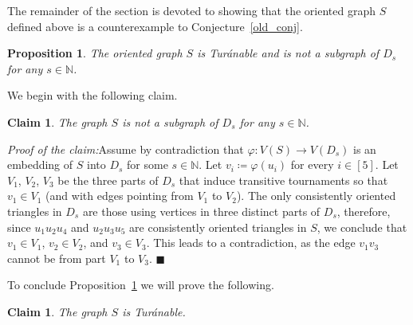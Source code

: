 \documentclass[11pt]{amsart}
\newtheorem{claim}[theorem]{Claim}
\newtheorem{prop}[theorem]{Proposition}
\def\N{\mathbb{N}}
\newenvironment{claimproof}[1]{\par\noindent\textit{Proof of the claim:}\space#1}{\leavevmode\unskip\penalty9999 \hbox{}\nobreak\hfill\quad\hbox{$\blacksquare$}}
\begin{document}
The remainder of the section is devoted to showing that the oriented graph $S$ defined above is a counterexample to Conjecture~\ref{old_conj}.

\begin{prop} \label{prop:S} 
    The oriented graph $S$ is Tur\'anable and is not a subgraph of $D_s$ for any $s \in \N$.
\end{prop}

We begin with the following claim.

\begin{claim} \label{claim:S_not_in_Ds}
    The graph $S$ is not a subgraph of $D_s$ for any $s \in \N$.
\end{claim}

\begin{claimproof}
    Assume by contradiction that $\varphi: V(S) \to V(D_s)$ is an embedding of $S$ into $D_s$ for some $s \in \N$. Let $v_i \coloneqq \varphi(u_i)$ for every $i \in [5]$. Let $V_1$, $V_2$, $V_3$ be the three parts of $D_s$ that induce transitive tournaments so that $v_1 \in V_1$ (and with edges pointing from $V_1$ to $V_2$). The only consistently oriented triangles in $D_s$ are those using vertices in three distinct parts of $D_s$, therefore, since $u_1u_2u_4$ and $u_2u_3u_5$ are consistently oriented triangles in $S$, we conclude that $v_1\in V_1$, $v_2 \in V_2$, and $v_3 \in V_3$. This leads to a contradiction, as the edge $v_1v_3$ cannot be from part $V_1$ to $V_3$. 
\end{claimproof}

To conclude Proposition~\ref{prop:S} we will prove the following.

\begin{claim} \label{claim:S_turanable}
    The graph $S$ is Tur\'anable.
\end{claim} 
\end{document}
